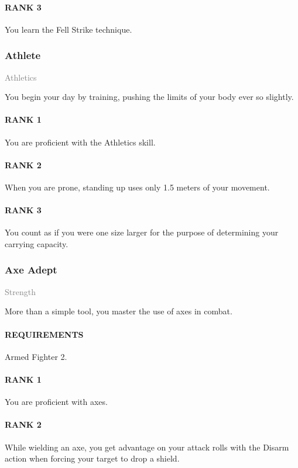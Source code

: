\paragraph{RANK 3} You learn the Fell Strike technique.

\subsubsection{Athlete} \label{tal::athlete}
\small \textcolor{gray}{Athletics}

\normalsize
You begin your day by training, pushing the limits of your body ever so slightly.
\paragraph{RANK 1} You are proficient with the Athletics skill.
\paragraph{RANK 2} When you are prone, standing up uses only 1.5 meters of your movement.
\paragraph{RANK 3} You count as if you were one size larger for the purpose of determining your carrying capacity.

\subsubsection{Axe Adept} \label{tal::axeadept}
\small{\textcolor{gray}{Strength}}

\normalsize
More than a simple tool, you master the use of axes in combat.
\paragraph{REQUIREMENTS} Armed Fighter 2.
\paragraph{RANK 1} You are proficient with axes.
\paragraph{RANK 2} While wielding an axe, you get advantage on your attack rolls with the Disarm action when forcing your target to drop a shield.

